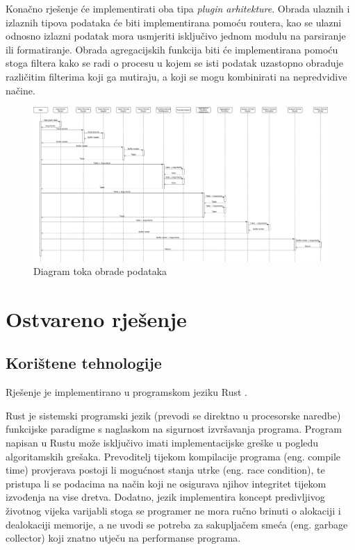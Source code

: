 \documentclass[times, utf8, zavrsni]{fer}
\begin{document}
Konačno rješenje će implementirati
oba tipa \textit{plugin arhitekture}. Obrada ulaznih i izlaznih tipova podataka
će biti
implementirana pomoću routera, kao se ulazni odnosno izlazni podatak mora
usmjeriti isključivo jednom modulu na parsiranje ili formatiranje. Obrada
agregacijskih funkcija biti će implementirana pomoću stoga filtera kako se
radi o procesu u kojem se isti podatak uzastopno obraduje različitim filterima
koji ga mutiraju, a koji se mogu kombinirati na nepredvidive načine.

\begin{figure}[h]
  \centering
  \includegraphics[width=\textheight, angle=90]{data_processing_flow_chart}
  \caption{Diagram toka obrade podataka}
  \label{data_processing_flow_chart}
\end{figure}

\chapter{Ostvareno rješenje}

\section{Korištene tehnologije}

Rješenje je implementirano u programskom jeziku Rust \cite{rust_lang_page}.

Rust je sistemski programski jezik (prevodi se direktno u procesorske
naredbe) funkcijske paradigme s naglaskom na sigurnost izvršavanja programa.
Program napisan u Rustu može isključivo imati implementacijske greške u pogledu
algoritamskih grešaka. Prevoditelj tijekom kompilacije programa (eng. compile
time) provjerava postoji li mogućnost stanja utrke (eng. race condition), te
pristupa li se podacima na način koji ne osigurava njihov integritet tijekom
izvođenja na vise dretva. Dodatno, jezik implementira koncept predivljivog
životnog vijeka varijabli stoga se programer ne mora ručno brinuti o alokaciji
i dealokaciji memorije, a ne uvodi se potreba za sakupljačem smeća (eng.
garbage collector) koji znatno utječu na performanse programa.
\end{document}

